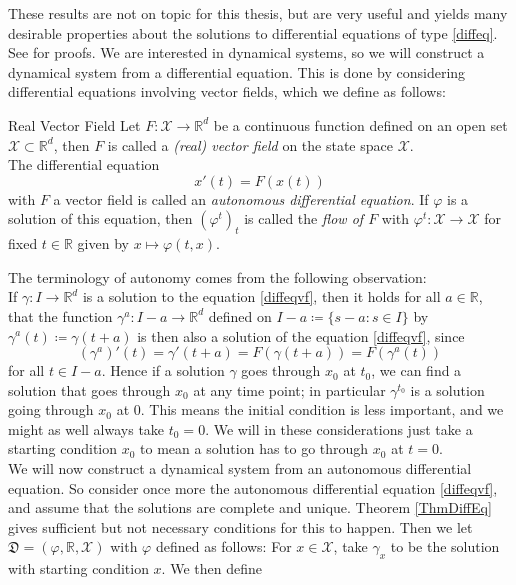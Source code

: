 \documentclass[11pt, a4paper]{memoir}
\theoremstyle{break}
\theoremstyle{break}
\theoremstyle{nonumberplain}
\newcommand{\mR}{\mathbb{R}}
\begin{document}
These results are not on topic for this thesis, but are very useful and yields many desirable properties about the solutions to differential equations of type \ref{diffeq}. See \cite{Dynamics} for proofs. We are interested in dynamical systems, so we will construct a dynamical system from a differential equation. This is done by considering differential equations involving vector fields, which we define as follows:
\begin{mydefinition}{Real Vector Field}
Let $F:\mathcal{X}\to\mR^d$ be a continuous function defined on an open set $\mathcal{X}\subset \mR^d$, then $F$ is called a \emph{(real) vector field} on the state space $\mathcal{X}$.\\[5pt]
The differential equation
\begin{equation}\label{diffeqvf}
x'(t)=F(x(t))
\end{equation}
with $F$ a vector field is called an \emph{autonomous differential equation}. If $\varphi$ is a solution of this equation, then $(\varphi^t)_t$ is called the \emph{flow of $F$} with $\varphi^t: \mathcal{X}\to \mathcal{X}$ for fixed $t\in \mR$ given by $x\mapsto\varphi(t,x)$.
\end{mydefinition}
\noindent The terminology of autonomy comes from the following observation:\\
If $\gamma:I\to\mR^d$ is a solution to the equation \ref{diffeqvf}, then it holds for all $a\in\mR$, that the function $\gamma^a:I-a\to\mR^d$ defined on $I-a\coloneqq \{s-a: s\in I\}$ by $\gamma^a(t)\coloneqq \gamma(t+a)$ is then also a solution of the equation \ref{diffeqvf}, since
$$\left(\gamma^a\right)'(t)=\gamma '(t+a)=F(\gamma(t+a))=F(\gamma^a(t))$$
for all $t\in I-a$. Hence if a solution $\gamma$ goes through $x_0$ at $t_0$, we can find a solution that goes through $x_0$ at any time point; in particular $\gamma^{t_0}$ is a solution going through $x_0$ at $0$. This means the initial condition is less important, and we might as well always take $t_0=0$. We will in these considerations just take a starting condition $x_0$ to mean a solution has to go through $x_0$ at $t=0$.\\[5pt]
We will now construct a dynamical system from an autonomous differential equation. So consider once more the autonomous differential equation \ref{diffeqvf}, and assume that the solutions are complete and unique. Theorem \ref{ThmDiffEq} gives sufficient but not necessary conditions for this to happen. Then we let $\mathfrak{D}=(\varphi,\mR,\mathcal{X})$ with $\varphi$ defined as follows: For $x\in \mathcal{X}$, take $\gamma_x$ to be the solution with starting condition $x$. We then define
\end{document}
